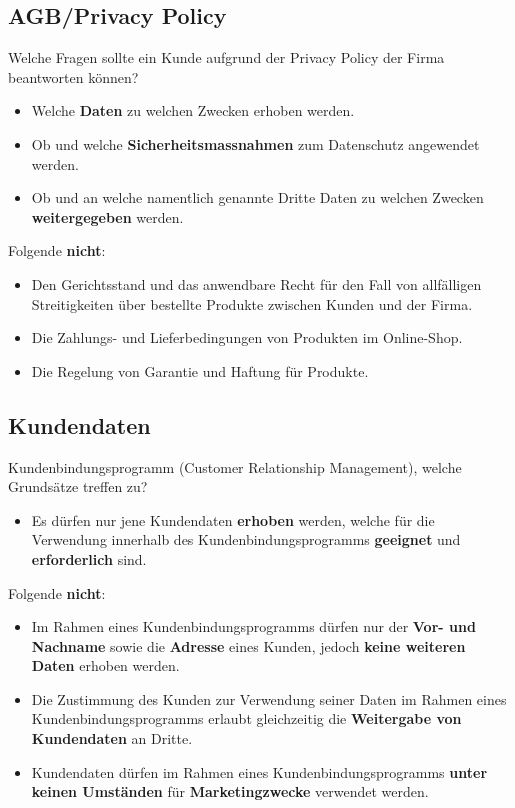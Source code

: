 \subsection{AGB/Privacy Policy}
Welche Fragen sollte ein Kunde aufgrund der Privacy Policy der Firma beantworten können?
\begin{itemize}
	\item Welche \textbf{Daten} zu welchen Zwecken erhoben werden.
	\item Ob und welche \textbf{Sicherheitsmassnahmen} zum Datenschutz angewendet werden.
	\item Ob und an welche namentlich genannte Dritte Daten zu welchen Zwecken \textbf{weitergegeben} werden.
\end{itemize}
\begin{Large}
Folgende \textbf{nicht}:
\end{Large}
\begin{itemize}
	\item Den Gerichtsstand und das anwendbare Recht für den Fall von allfälligen Streitigkeiten über bestellte Produkte zwischen Kunden und der Firma.
	\item Die Zahlungs- und Lieferbedingungen von Produkten im Online-Shop.
	\item Die Regelung von Garantie und Haftung für Produkte.
\end{itemize}

\subsection{Kundendaten}
Kundenbindungsprogramm (Customer Relationship Management), welche Grundsätze treffen zu?
\begin{itemize}
	\item Es dürfen nur jene Kundendaten \textbf{erhoben} werden, welche für die Verwendung innerhalb des Kundenbindungsprogramms \textbf{geeignet} und \textbf{erforderlich} sind.
\end{itemize}
\begin{Large}
Folgende \textbf{nicht}:
\end{Large}
\begin{itemize}
	\item Im Rahmen eines Kundenbindungsprogramms dürfen nur der \textbf{Vor- und Nachname} sowie die \textbf{Adresse} eines Kunden, jedoch \textbf{keine weiteren Daten} erhoben werden.
	\item Die Zustimmung des Kunden zur Verwendung seiner Daten im Rahmen eines Kundenbindungsprogramms erlaubt gleichzeitig die \textbf{Weitergabe von Kundendaten} an Dritte.
	\item Kundendaten dürfen im Rahmen eines Kundenbindungsprogramms \textbf{unter keinen Umständen} für \textbf{Marketingzwecke} verwendet werden.
\end{itemize}

